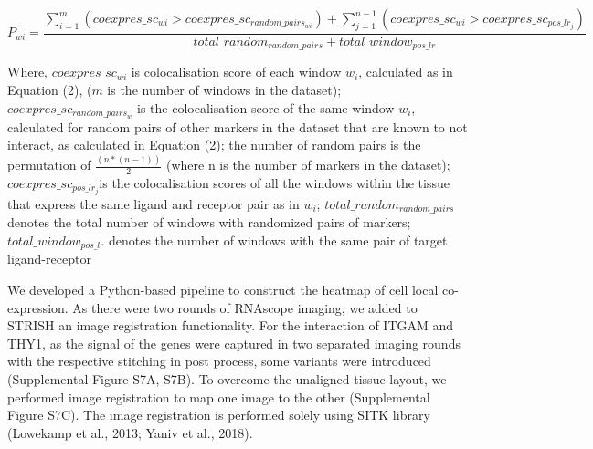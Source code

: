 \begin{equation}
    P_{wi} = \frac{\sum_{i=1}^{m}(coexpres\_sc_{wi} > coexpres\_sc_{random\_pairs_{wi}})+ \sum_{j=1}^{n-1}(coexpres\_sc_{wi} > coexpres\_sc_{pos\_lr_j}) }{total\_random_{random\_pairs} + total\_window_{pos\_lr}}
\end{equation}

Where,	$coexpres\_sc_{wi}$  is colocalisation score of each window $w_i$, calculated as in Equation (2), ($m$ is the number of windows in the dataset); $coexpres\_sc_{random\_pairs_w}$ is the colocalisation score of the same window $w_i$, calculated for random pairs of other markers in the dataset that are known to not interact, as calculated in Equation (2); the number of random pairs is the permutation of $\frac{(n*(n-1))}{2}$ (where n is the number of markers in the dataset); $coexpres
\_sc_{pos\_lr_j}$is the colocalisation scores of all the windows within the tissue that express the same ligand and receptor pair as in $w_i$; $total\_random_{random\_pairs}$ denotes the total number of windows with randomized pairs of markers; $total\_window_{pos\_lr}$  denotes the number of windows with the same pair of target ligand-receptor

We developed a Python-based pipeline to construct the heatmap of cell local co-expression. 
As there were two rounds of RNAscope imaging, we added to STRISH an image registration functionality. For the interaction of ITGAM and THY1, as the signal of the genes were captured in two separated imaging rounds with the respective stitching in post process, some variants were introduced (Supplemental Figure S7A, S7B). To overcome the unaligned tissue layout, we performed image registration to map one image to the other (Supplemental Figure S7C). The image registration is performed solely using SITK library (Lowekamp et al., 2013; Yaniv et al., 2018).  

